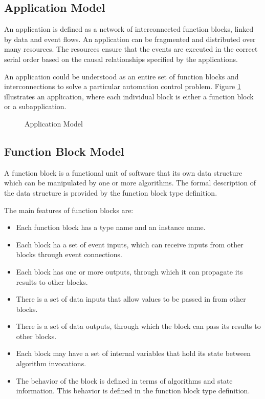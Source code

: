 \subsection*{Application Model} 
An application is defined as a network of interconnected
function blocks, linked by data and event flows. An
application can be fragmented and distributed over many
resources. The resources ensure that the events are executed
in the correct serial order based on the causal
relationships specified by the applications.
  
An application could be understood as an entire set of
function blocks and interconnections to solve a particular
automation control problem. Figure \ref{f:Application_Model}
illustrates an application, where each individual block is
either a function block or a subapplication.

\begin{figure}
  \begin{center}
    \caption[Application Model]
            {Application Model{\protect ~\cite{iec:614991:2000}}} 
    \label{f:Application_Model}
  \end{center}
\end{figure}
  
\subsection*{Function Block Model} 
A function block is a functional unit of software that its
own data structure which can be manipulated by one or more
algorithms. The formal description of the data structure is
provided by the function block type definition.
  
The main features of function blocks are:
\begin{itemize}
\item Each function block has a type name and an instance
  name.
\item Each block ha a set of event inputs, which can
  receive inputs from other blocks through event
  connections.
\item Each block has one or more outputs, through which it
  can propagate its results to other blocks.
\item There is a set of data inputs that allow values to
  be passed in from other blocks.
\item There is a set of data outputs, through which the
  block can pass its results to other blocks.
\item Each block may have a set of internal variables that
  hold its state between algorithm invocations.
\item The behavior of the block is defined in terms of
  algorithms and state information. This behavior is
  defined in the function block type definition.
\end{itemize}

